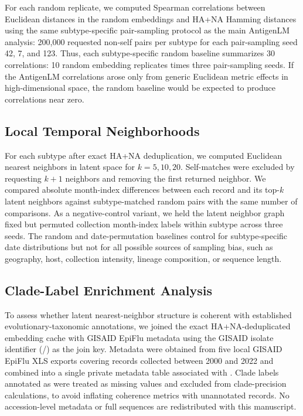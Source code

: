 \documentclass[11pt]{article}
\begin{document}
For each random replicate, we computed Spearman correlations between Euclidean distances in the random embeddings and HA+NA Hamming distances using the same subtype-specific pair-sampling protocol as the main AntigenLM analysis: 200,000 requested non-self pairs per subtype for each pair-sampling seed 42, 7, and 123. Thus, each subtype-specific random baseline summarizes 30 correlations: 10 random embedding replicates times three pair-sampling seeds. If the AntigenLM correlations arose only from generic Euclidean metric effects in high-dimensional space, the random baseline would be expected to produce correlations near zero.

\subsection{Local Temporal Neighborhoods}

For each subtype after exact HA+NA deduplication, we computed Euclidean nearest neighbors in latent space for $k=5,10,20$. Self-matches were excluded by requesting $k+1$ neighbors and removing the first returned neighbor. We compared absolute month-index differences between each record and its top-$k$ latent neighbors against subtype-matched random pairs with the same number of comparisons. As a negative-control variant, we held the latent neighbor graph fixed but permuted collection month-index labels within subtype across three seeds. The random and date-permutation baselines control for subtype-specific date distributions but not for all possible sources of sampling bias, such as geography, host, collection intensity, lineage composition, or sequence length.

\subsection{Clade-Label Enrichment Analysis}

To assess whether latent nearest-neighbor structure is coherent with established evolutionary-taxonomic annotations, we joined the exact HA+NA-deduplicated embedding cache with GISAID EpiFlu metadata using the GISAID isolate identifier (/) as the join key. Metadata were obtained from five local GISAID EpiFlu XLS exports covering records collected between 2000 and 2022 and combined into a single private metadata table associated with . Clade labels annotated as  were treated as missing values and excluded from clade-precision calculations, to avoid inflating coherence metrics with unannotated records. No accession-level metadata or full sequences are redistributed with this manuscript.
\end{document}
